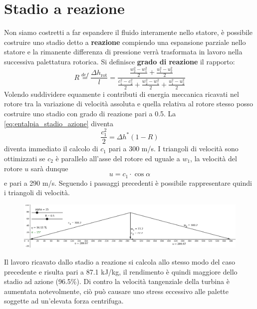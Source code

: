 \documentclass[a4paper,12pt]{article}
\begin{document}
\section{Stadio a reazione}
\label{sec:stadio_a_reazione}
Non siamo costretti a far espandere il fluido interamente nello statore, è possibile costruire uno stadio detto a \textbf{reazione} compiendo una espansione parziale
nello statore e la rimanente differenza di pressione verrà trasformata in lavoro nella successiva palettatura rotorica.
Si definisce \textbf{grado di reazione} il rapporto:
\begin{equation}
    \label{eq:grado_di_reazione}
    R \stackrel{def}{=} \frac{\Delta h_{\text{rot}}}{l} = \frac{\frac{w_2^2-w_1^2}{2} + \frac{u_1^2 - u_2^2}{2} }  %
                                                                {\frac{c_1^2-c_2^2}{2} + \frac{w_2^2-w_1^2}{2} + \frac{u_1^2 - u_2^2}{2}}  %
\end{equation}
Volendo suddividere equamente i contributi di energia meccanica ricavati nel rotore tra la variazione di velocità assoluta e quella relativa al rotore stesso
posso costruire uno stadio con grado di reazione pari a 0.5.
La \eqref{eq:entalpia_stadio_azione} diventa
\begin{equation}
    \frac{c_1^2}{2} = \Delta h^* (1-R)
\end{equation}
diventa immediato il calcolo di $c_1$ pari a 300 m/s.
I triangoli di velocità sono ottimizzati se $c_2$ è parallelo all'asse del rotore ed uguale a $w_1$, la velocità del rotore $u$ sarà dunque
\begin{equation}
    u = c_1 \cdot \cos \alpha
\end{equation}
e pari a 290 m/s.
Seguendo i passaggi precedenti è possibile rappresentare quindi i triangoli di velocità.
\begin{figure}[H]
    \label{fig:triangoli_reazione}
    \centering
    \includegraphics[width=\linewidth]{media/triangoli_reazione.png}
\end{figure}
Il lavoro ricavato dallo stadio a reazione si calcola allo stesso modo del caso precedente e risulta pari a 87.1 kJ/kg, il rendimento è quindi maggiore dello stadio
ad azione (96.5\%). Di contro la velocità tangenziale della turbina è aumentata notevolmente, ciò può causare uno stress eccessivo alle palette soggette ad un'elevata
forza centrifuga.
\end{document}

